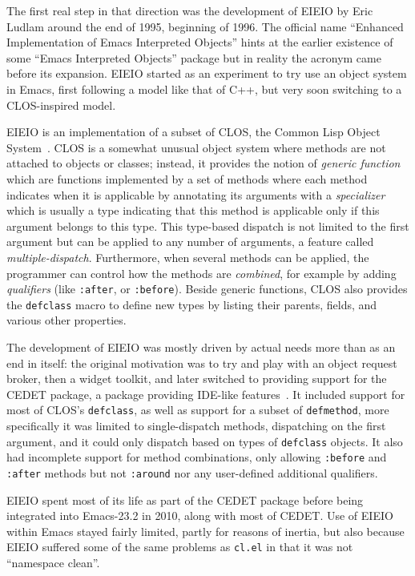 \documentclass[format=acmsmall, review]{acmart}
\begin{document}
The first real step in that direction was the development of EIEIO by Eric
Ludlam around the end of 1995, beginning of 1996.  The official name ``Enhanced
Implementation of Emacs Interpreted Objects'' hints at the earlier existence
of some ``Emacs Interpreted Objects'' package but in reality the acronym
came before its expansion.  EIEIO started as an experiment to try use
an object system in Emacs, first following a model like that of C++, but
very soon switching to a CLOS-inspired model.

EIEIO is an implementation of a subset of CLOS, the Common Lisp Object
System~\cite{DeMichielGabriel1987}.  CLOS is a somewhat unusual object
system where methods are not attached to objects or classes; instead, it
provides the notion of \emph{generic function} which are functions
implemented by a set of methods where each method indicates when it is
applicable by annotating its arguments with a \emph{specializer} which is
usually a type indicating that this method is applicable only if this
argument belongs to this type.  This type-based dispatch is not limited to
the first argument but can be applied to any number of arguments, a feature
called \emph{multiple-dispatch}.  Furthermore, when several methods can be
applied, the programmer can control how the methods are \emph{combined}, for
example by adding \emph{qualifiers} (like \texttt{:after}, or
\texttt{:before}).  Beside generic functions, CLOS also provides the
\texttt{defclass} macro to define new types by listing their parents,
fields, and various other properties.

The development of EIEIO was mostly
driven by actual needs more than as an end in itself: the original
motivation was to try and play with an object request broker, then a widget
toolkit, and later switched to providing support for the CEDET
package, a package providing IDE-like features~\cite{Ludlam18}.
It included support for most of CLOS's \texttt{defclass}, as well as support
for a subset of \texttt{defmethod}, more specifically it was limited to
single-dispatch methods, dispatching on the first argument, and it could
only dispatch based on types of \texttt{defclass} objects.  It also had
incomplete support for method combinations, only allowing \texttt{:before}
and \texttt{:after} methods but not \texttt{:around} nor any user-defined
additional qualifiers.

EIEIO spent most of its life as part of the CEDET package
before being integrated into Emacs-23.2 in
2010, along with most of CEDET.  Use of EIEIO within Emacs stayed fairly
limited, partly for reasons of inertia, but also because EIEIO suffered some
of the same problems as \texttt{cl.el} in that it was not
``namespace clean''.
\end{document}
